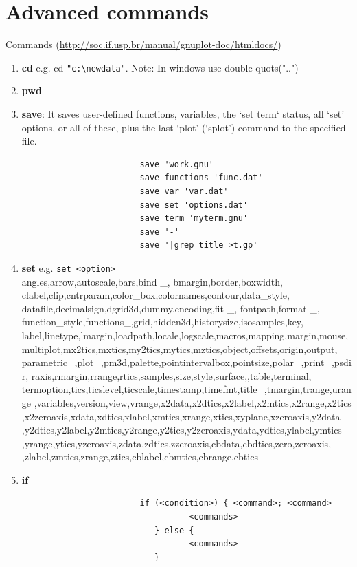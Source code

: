 \documentclass{beamer}
\begin{document}
	\section{Advanced commands}
		\begin{frame}{Commands}
			\scriptsize
			(\url{http://soc.if.usp.br/manual/gnuplot-doc/htmldocs/})
			\begin{enumerate}
				\item \textbf{cd} e.g. cd \verb|"c:\newdata"|.   Note: In windows use double quots("..")\\
				\item \textbf{pwd}	
				\item \textbf{save}: It saves user-defined functions, variables, the 
				`set term` status, all `set' options, or all of these, plus the last 
				`plot' (`splot') command to the specified file. 
					\begin{verbatim}
						save 'work.gnu'
						save functions 'func.dat'
						save var 'var.dat'
						save set 'options.dat'
						save term 'myterm.gnu'
						save '-'
						save '|grep title >t.gp'     
					\end{verbatim}
				\item \textbf{set} e.g. \verb|set <option>|\\
				angles,arrow,autoscale,bars,bind \_, bmargin,border,boxwidth,
				clabel,clip,cntrparam,color\_box,colornames,contour,data\_style,
				datafile,decimalsign,dgrid3d,dummy,encoding,fit \_, fontpath,format \_,
				function\_style,functions\_,grid,hidden3d,historysize,isosamples,key,
				label,linetype,lmargin,loadpath,locale,logscale,macros,mapping,margin,mouse,
				multiplot,mx2tics,mxtics,my2tics,mytics,mztics,object,offsets,origin,output,
				parametric\_,plot\_,pm3d,palette,pointintervalbox,pointsize,polar\_,print\_,psdir,
				raxis,rmargin,rrange,rtics,samples,size,style,surface,,table,terminal,
				termoption,tics,ticslevel,ticscale,timestamp,timefmt,title\_,tmargin,trange,urange
				,variables,version,view,vrange,x2data,x2dtics,x2label,x2mtics,x2range,x2tics
				,x2zeroaxis,xdata,xdtics,xlabel,xmtics,xrange,xtics,xyplane,xzeroaxis,y2data
				,y2dtics,y2label,y2mtics,y2range,y2tics,y2zeroaxis,ydata,ydtics,ylabel,ymtics
				,yrange,ytics,yzeroaxis,zdata,zdtics,zzeroaxis,cbdata,cbdtics,zero,zeroaxis,
				,zlabel,zmtics,zrange,ztics,cblabel,cbmtics,cbrange,cbtics\\[5em]


				\item 	\textbf{if}
					\begin{verbatim}
						if (<condition>) { <command>; <command>
				                  <commands>
				           } else {
				                  <commands>
				           }
					\end{verbatim}



\end{enumerate}
\end{frame}
\end{document}
